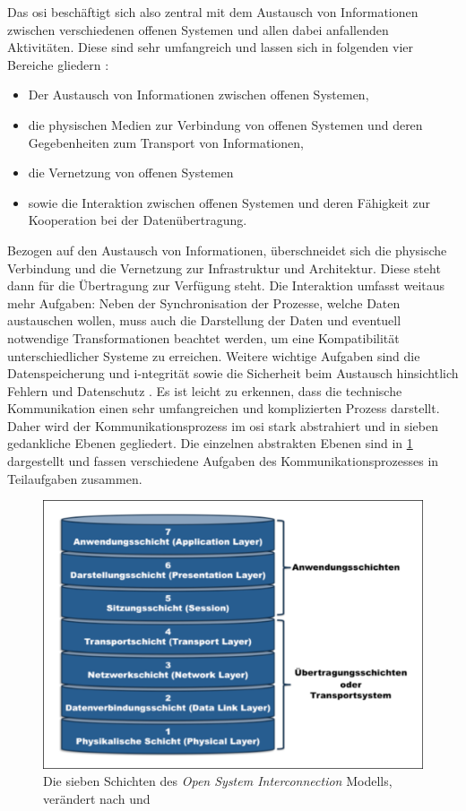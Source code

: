 Das \acrshort{osi} beschäftigt sich also zentral mit dem Austausch von Informationen zwischen verschiedenen offenen Systemen und allen dabei anfallenden Aktivitäten. Diese sind sehr umfangreich und lassen sich in folgenden vier Bereiche gliedern \cite[S.~3f.]{osi96}:
\begin{itemize}
	\item Der Austausch von Informationen zwischen offenen Systemen,
	\item die physischen Medien zur Verbindung von offenen Systemen und deren Gegebenheiten zum Transport von Informationen,
	\item die Vernetzung von offenen Systemen
	\item sowie die Interaktion zwischen offenen Systemen und deren Fähigkeit zur Kooperation bei der Datenübertragung.
\end{itemize}
Bezogen auf den Austausch von Informationen, überschneidet sich die physische Verbindung und die Vernetzung zur Infrastruktur und Architektur. Diese steht dann für die Übertragung zur Verfügung steht. Die Interaktion umfasst weitaus mehr Aufgaben: Neben der Synchronisation der Prozesse, welche Daten austauschen wollen, muss auch die Darstellung der Daten und eventuell notwendige Transformationen beachtet werden, um eine Kompatibilität unterschiedlicher Systeme zu erreichen. Weitere wichtige Aufgaben sind die Datenspeicherung und i-ntegrität sowie die Sicherheit beim Austausch hinsichtlich Fehlern und Datenschutz \cite[S.~4]{osi96}.
Es ist leicht zu erkennen, dass die technische Kommunikation einen sehr umfangreichen und komplizierten Prozess darstellt. Daher wird der Kommunikationsprozess im \acrshort{osi} stark abstrahiert und in sieben gedankliche Ebenen gegliedert. Die einzelnen abstrakten Ebenen sind in \ref{fig:osi} dargestellt und fassen verschiedene Aufgaben des Kommunikationsprozesses in Teilaufgaben zusammen.

\begin{figure}
\centering
\includegraphics[width=\textwidth]{abbildungen/20160112_osi}
\caption[Die sieben Schichten des Open System Interconnection Modells]{Die sieben Schichten des \textit{Open System Interconnection} Modells, verändert nach \cite[S.~10]{schn06} und \cite[S.~28]{osi96}}
\label{fig:osi}
\end{figure}


